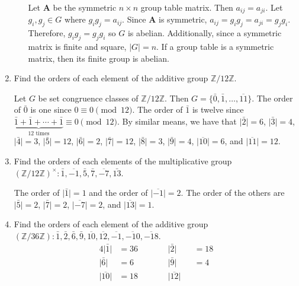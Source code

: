 \begin{enumerate}
\begin{enumerate}[label = (\alph*)]
    \par\smallskip
    Let \(\mathbf{A}\) be the symmetric \(n\times n\) group table matrix.
    Then \(a_{ij} = a_{ji}\).
    Let \(g_i,g_j\in G\) where \(g_ig_j = a_{ij}\).
    Since \(\mathbf{A}\) is symmetric, \(a_{ij} = g_ig_j = a_{ji} = g_jg_i\).
    Therefore, \(g_ig_j = g_jg_i\) so \(G\) is abelian.
    Additionally, since a symmetric matrix is finite and square,
    \(\lvert G\rvert = n\).
    If a group table is a symmetric matrix, then its finite group is abelian.
  \end{enumerate}
\item
  Find the orders of each element of the additive group
  \(\mathbb{Z}/12\mathbb{Z}\).
  \par\smallskip
  Let \(G\) be set congruence classes of \(\mathbb{Z}/12\mathbb{Z}\).
  Then \(G = \{\bar{0},\bar{1},\ldots,\overline{11}\}\).
  The order of \(\bar{0}\) is one since \(0\equiv 0\pmod{12}\).
  The order of \(\bar{1}\) is twelve since
  \(\underbrace{\bar{1} + \bar{1} + \cdots + \bar{1}}_{12\text{ times}}\equiv
  0\pmod{12}\).
  By similar means, we have that \(\lvert\bar{2}\rvert = 6\),
  \(\lvert\bar{3}\rvert = 4\), \(\lvert\bar{4}\rvert = 3\),
  \(\lvert\bar{5}\rvert = 12\), \(\lvert\bar{6}\rvert = 2\),
  \(\lvert\bar{7}\rvert = 12\), \(\lvert\bar{8}\rvert = 3\),
  \(\lvert\bar{9}\rvert = 4\), \(\lvert\overline{10}\rvert = 6\), and
  \(\lvert\overline{11}\rvert = 12\).
\item
  Find the orders of each elements of the multiplicative group
  \((\mathbb{Z}/12\mathbb{Z})^{\times}\colon\bar{1}, \overline{-1}, \bar{5},
  \bar{7}, \overline{-7}, \bar{13}\).
  \par\smallskip
  The order of \(\lvert\bar{1}\rvert = 1\) and the order of
  \(\lvert\overline{-1}\rvert = 2\).
  The order of the others are \(\lvert\bar{5}\rvert = 2\),
  \(\lvert\bar{7}\rvert = 2\), \(\lvert\overline{-7}\rvert = 2\),
  and \(\lvert\overline{13}\rvert = 1\).
\item
  Find the orders of each element of the additive group
  \((\mathbb{Z}/36\mathbb{Z})\colon\bar{1}, \bar{2}, \bar{6}, \bar{9},
  \overline{10}, \overline{12}, \overline{-1}, \overline{-10},
  \overline{-18}\).
  \begin{alignat*}{4}
    \lvert\bar{1}\rvert & = 36 & \qquad & \lvert\bar{2}\rvert &&{}= 18\\
    \lvert\bar{6}\rvert & = 6 & \qquad & \lvert\bar{9}\rvert &&{}= 4\\
    \lvert\overline{10}\rvert & = 18 & \qquad & \lvert\overline{12}\rvert

\end{alignat*}
\end{enumerate}
